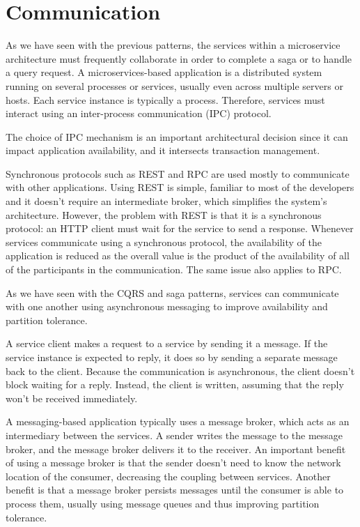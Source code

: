 \documentclass[conference]{IEEEtran}
\begin{document}
\section{Communication}

As we have seen with the previous patterns, the services within a microservice architecture must frequently collaborate in order to complete a saga or to handle a query request. A microservices-based application is a distributed system running on several processes or services, usually even across multiple servers or hosts. Each service instance is typically a process. Therefore, services must interact using an inter-process communication (IPC) protocol.

The choice of IPC mechanism is an important architectural decision since it can impact application availability, and it intersects transaction management.

Synchronous protocols such as REST \cite{rest} and RPC \cite{rpc} are used mostly to communicate with other applications. Using REST is simple, familiar to most of the developers and it doesn't require an intermediate broker, which simplifies the system's architecture. However, the problem with REST is that it is a synchronous protocol: an HTTP client must wait for the service to send a response. Whenever services communicate using a synchronous protocol, the availability of the application is reduced as the overall value is the product of the availability of all of the participants in the communication. The same issue also applies to RPC.

As we have seen with the CQRS and saga patterns, services can communicate with one another using asynchronous messaging to improve availability and partition tolerance. 

A service client makes a request to a service by sending it a message. If the service instance is expected to reply, it does so by sending a separate message back to the client. Because the communication is asynchronous, the client doesn't block waiting for a reply. Instead, the client is written, assuming that the reply won't be received immediately.

A messaging-based application typically uses a message broker, which acts as an intermediary between the services. A sender writes the message to the message broker, and the message broker delivers it to the receiver. An important benefit of using a message broker is that the sender doesn't need to know the network location of the consumer, decreasing the coupling between services. Another benefit is that a message broker persists messages until the consumer is able to process them, usually using message queues and thus improving partition tolerance. 
\end{document}
